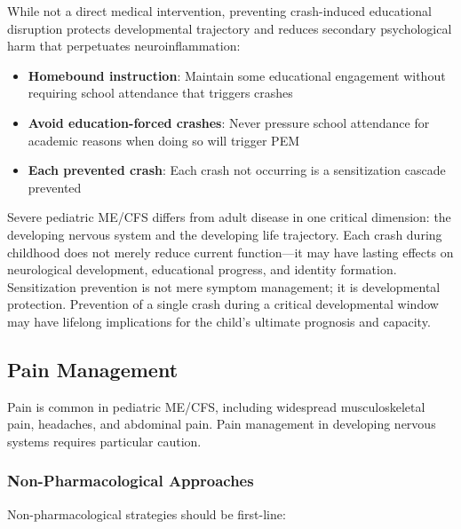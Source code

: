 \begin{protocol}
While not a direct medical intervention, preventing crash-induced educational disruption protects developmental trajectory and reduces secondary psychological harm that perpetuates neuroinflammation:

\begin{itemize}
    \item \textbf{Homebound instruction}: Maintain some educational engagement without requiring school attendance that triggers crashes
    \item \textbf{Avoid education-forced crashes}: Never pressure school attendance for academic reasons when doing so will trigger PEM
    \item \textbf{Each prevented crash}: Each crash not occurring is a sensitization cascade prevented
\end{itemize}

\end{protocol}

\begin{practicalwarning}
Severe pediatric ME/CFS differs from adult disease in one critical dimension: the developing nervous system and the developing life trajectory. Each crash during childhood does not merely reduce current function---it may have lasting effects on neurological development, educational progress, and identity formation. Sensitization prevention is not mere symptom management; it is developmental protection. Prevention of a single crash during a critical developmental window may have lifelong implications for the child's ultimate prognosis and capacity.
\end{practicalwarning}

\subsection{Pain Management}
\label{subsec:ped-severe-pain}

Pain is common in pediatric ME/CFS, including widespread musculoskeletal pain, headaches, and abdominal pain. Pain management in developing nervous systems requires particular caution.

\subsubsection{Non-Pharmacological Approaches}

Non-pharmacological strategies should be first-line:

